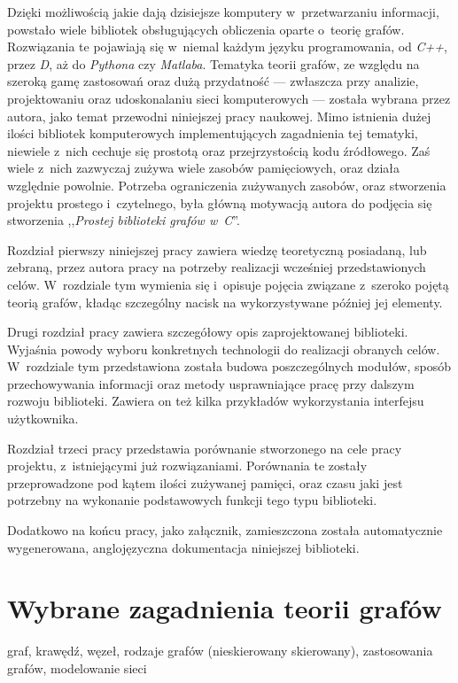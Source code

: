 \documentclass[a4paper,12pt,polish,oneside]{thesis}
\begin{document}
Dzięki możliwością jakie dają dzisiejsze komputery w~przetwarzaniu informacji, powstało wiele bibliotek obsługujących obliczenia oparte o~teorię grafów.
Rozwiązania te pojawiają się w~niemal każdym języku programowania, od \emph{C++}, przez \emph{D}, aż do \emph{Pythona} czy \emph{Matlaba}.
Tematyka teorii grafów, ze względu na szeroką gamę zastosowań oraz dużą przydatność --- zwłaszcza przy analizie, projektowaniu oraz udoskonalaniu sieci komputerowych --- została wybrana przez autora, jako temat przewodni niniejszej pracy naukowej.
Mimo istnienia dużej ilości bibliotek komputerowych implementujących zagadnienia tej tematyki, niewiele z~nich cechuje się prostotą oraz przejrzystością kodu źródłowego.
Zaś wiele z~nich zazwyczaj zużywa wiele zasobów pamięciowych, oraz działa względnie powolnie.
Potrzeba ograniczenia zużywanych zasobów, oraz stworzenia projektu prostego i~czytelnego, była główną motywacją autora do podjęcia się stworzenia ,,\emph{Prostej biblioteki grafów w~C}''.

Rozdział pierwszy niniejszej pracy zawiera wiedzę teoretyczną posiadaną, lub zebraną, przez autora pracy na potrzeby realizacji wcześniej przedstawionych celów.
W~rozdziale tym wymienia się i~opisuje pojęcia związane z~szeroko pojętą teorią grafów, kładąc szczególny nacisk na wykorzystywane później jej elementy.

Drugi rozdział pracy zawiera szczegółowy opis zaprojektowanej biblioteki.
Wyjaśnia powody wyboru konkretnych technologii do realizacji obranych celów.
W~rozdziale tym przedstawiona została budowa poszczególnych modułów, sposób przechowywania informacji oraz metody usprawniające pracę przy dalszym rozwoju biblioteki.
Zawiera on też kilka przykładów wykorzystania interfejsu użytkownika.

Rozdział trzeci pracy przedstawia porównanie stworzonego na cele pracy projektu, z~istniejącymi już rozwiązaniami.
Porównania te zostały przeprowadzone pod kątem ilości zużywanej pamięci, oraz czasu jaki jest potrzebny na wykonanie podstawowych funkcji tego typu biblioteki.

Dodatkowo na końcu pracy, jako załącznik, zamieszczona została automatycznie wygenerowana, anglojęzyczna dokumentacja niniejszej biblioteki.

\chapter{Wybrane zagadnienia teorii grafów}
graf, krawędź, węzeł, rodzaje grafów (nieskierowany skierowany), zastosowania grafów, modelowanie sieci 
\end{document}
